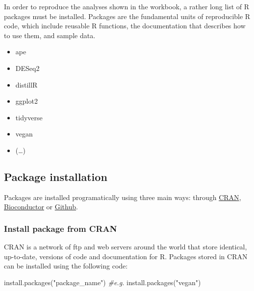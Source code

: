 \documentclass[
]{book}
\newenvironment{Shaded}{\begin{snugshade}}{\end{snugshade}}
\newcommand{\CommentTok}[1]{\textcolor[rgb]{0.56,0.35,0.01}{\textit{#1}}}
\newcommand{\FunctionTok}[1]{\textcolor[rgb]{0.00,0.00,0.00}{#1}}
\newcommand{\NormalTok}[1]{#1}
\newcommand{\StringTok}[1]{\textcolor[rgb]{0.31,0.60,0.02}{#1}}
\providecommand{\tightlist}{%
  \setlength{\itemsep}{0pt}\setlength{\parskip}{0pt}}
\begin{document}
In order to reproduce the analyses shown in the workbook, a rather long list of R packages must be installed. Packages are the fundamental units of reproducible R code, which include reusable R functions, the documentation that describes how to use them, and sample data.

\begin{itemize}
\tightlist
\item
  ape
\item
  DESeq2
\item
  distillR
\item
  ggplot2
\item
  tidyverse
\item
  vegan
\item
  (\ldots)
\end{itemize}

\hypertarget{package-installation}{%
\subsection*{Package installation}\label{package-installation}}

Packages are installed programatically using three main ways: through \href{https://cran.r-project.org/web/packages/available_packages_by_name.html}{CRAN}, \href{https://www.bioconductor.org/packages/release/bioc/}{Bioconductor} or \href{https://github.com/}{Github}.

\hypertarget{install-package-from-cran}{%
\subsubsection*{Install package from CRAN}\label{install-package-from-cran}}

CRAN is a network of ftp and web servers around the world that store identical, up-to-date, versions of code and documentation for R. Packages stored in CRAN can be installed using the following code:

\begin{Shaded}
\begin{Highlighting}[]
\FunctionTok{install.packages}\NormalTok{(}\StringTok{"package\_name"}\NormalTok{)}
\CommentTok{\#e.g.}
\FunctionTok{install.packages}\NormalTok{(}\StringTok{"vegan"}\NormalTok{)}
\end{Highlighting}
\end{Shaded}
\end{document}
